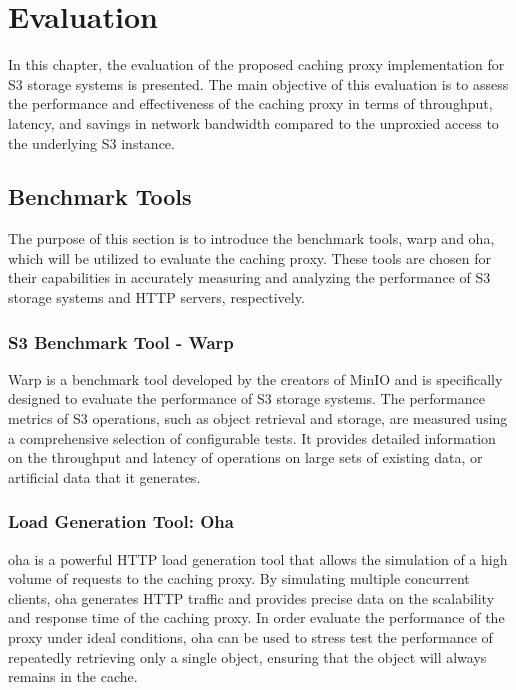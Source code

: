\chapter{Evaluation}

In this chapter, the evaluation of the proposed caching proxy implementation for S3 storage systems is presented. The main objective of this evaluation is to assess the performance and effectiveness of the caching proxy in terms of throughput, latency, and savings in network bandwidth compared to the unproxied access to the underlying S3 instance.

\section{Benchmark Tools}

The purpose of this section is to introduce the benchmark tools, warp and oha, which will be utilized to evaluate the caching proxy. These tools are chosen for their capabilities in accurately measuring and analyzing the performance of S3 storage systems and HTTP servers, respectively.

\subsection{S3 Benchmark Tool - Warp}

Warp is a benchmark tool developed by the creators of MinIO and is specifically designed to evaluate the performance of S3 storage systems. The performance metrics of S3 operations, such as object retrieval and storage, are measured using a comprehensive selection of configurable tests. It provides detailed information on the throughput and latency of operations on large sets of existing data, or artificial data that it generates.

\subsection{Load Generation Tool: Oha}

oha is a powerful HTTP load generation tool that allows the simulation of a high volume of requests to the caching proxy. By simulating multiple concurrent clients, oha generates HTTP traffic and provides precise data on the scalability and response time of the caching proxy. In order evaluate the performance of the proxy under ideal conditions, oha can be used to stress test the performance of repeatedly retrieving only a single object, ensuring that the object will always remains in the cache.

